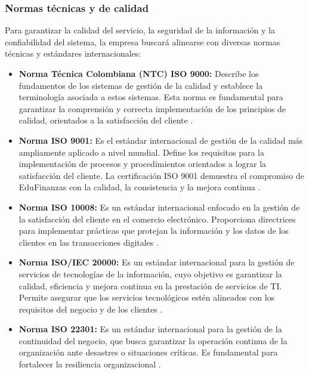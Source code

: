 {}
\subsubsection*{Normas técnicas y de calidad}


Para garantizar la calidad del servicio, la seguridad de la información y la confiabilidad del sistema, la empresa buscará alinearse con diversas normas técnicas y estándares internacionales:

\begin{itemize}
	\item \textbf{Norma Técnica Colombiana (NTC) ISO 9000:} Describe los fundamentos de los sistemas de gestión de la calidad y establece la terminología asociada a estos sistemas. Esta norma es fundamental para garantizar la comprensión y correcta implementación de los principios de calidad, orientados a la satisfacción del cliente \parencite{ISO9000}.
	
	\item \textbf{Norma ISO 9001:} Es el estándar internacional de gestión de la calidad más ampliamente aplicado a nivel mundial. Define los requisitos para la implementación de procesos y procedimientos orientados a lograr la satisfacción del cliente. La certificación ISO 9001 demuestra el compromiso de EduFinanzas con la calidad, la consistencia y la mejora continua \parencite{ISO9001}.
	
	\item \textbf{Norma ISO 10008:} Es un estándar internacional enfocado en la gestión de la satisfacción del cliente en el comercio electrónico. Proporciona directrices para implementar prácticas que protejan la información y los datos de los clientes en las transacciones digitales \parencite{ISO10008}.
	
	\item \textbf{Norma ISO/IEC 20000:} Es un estándar internacional para la gestión de servicios de tecnologías de la información, cuyo objetivo es garantizar la calidad, eficiencia y mejora continua en la prestación de servicios de TI. Permite asegurar que los servicios tecnológicos estén alineados con los requisitos del negocio y de los clientes \parencite{ISO20000}.
	
	\item \textbf{Norma ISO 22301:} Es un estándar internacional para la gestión de la continuidad del negocio, que busca garantizar la operación continua de la organización ante desastres o situaciones críticas. Es fundamental para fortalecer la resiliencia organizacional \parencite{ISO22301}.
	

\end{itemize}
